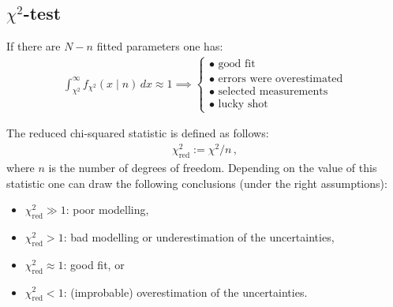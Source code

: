 
\subsection{\texorpdfstring{$\chi^2$}{Chi squared}-test}\label{section:chi_squared_test}

    \begin{property}\label{statistics:chi_square}
        If there are $N-n$ fitted parameters one has:
        \begin{gather}
            \int_{\chi^2}^\infty f_{\chi^2}(x\mid n)\,dx\approx 1\implies
            \begin{cases}
                \bullet\text{ good fit}\\
                \bullet\text{ errors were overestimated}\\
                \bullet\text{ selected measurements}\\
                \bullet\text{ lucky shot}
            \end{cases}
        \end{gather}
    \end{property}
    \begin{property}
        The reduced chi-squared statistic is defined as follows:
        \begin{gather}
            \chi^2_{\text{red}} := \chi^2/n\,,
        \end{gather}
        where $n$ is the number of degrees of freedom. Depending on the value of this statistic one can draw the following conclusions (under the right assumptions):
        \begin{itemize}
            \item $\chi^2_{\text{red}}\gg1$: poor modelling,
            \item $\chi^2_{\text{red}}>1$: bad modelling or underestimation of the uncertainties,
            \item $\chi^2_{\text{red}}\approx1$: good fit, or
            \item $\chi^2_{\text{red}}<1$: (improbable) overestimation of the uncertainties.
        \end{itemize}
    \end{property}

